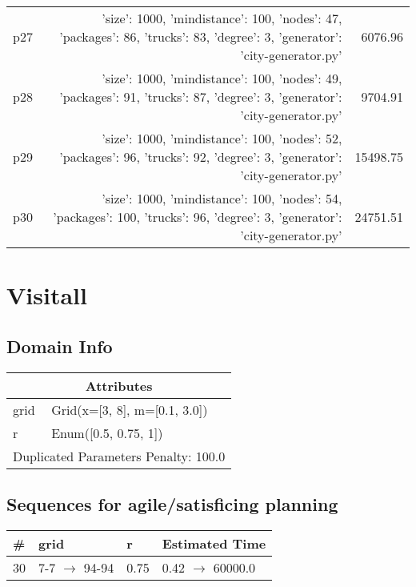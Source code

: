 \documentclass{article}
\begin{document}
\begin{center}
\begin{tabular}{@{}l|r|r@{}}
  p27&{'size': 1000, 'mindistance': 100, 'nodes': 47, 'packages': 86, 'trucks': 83, 'degree': 3, 'generator': 'city-generator.py'}&6076.96\\
  p28&{'size': 1000, 'mindistance': 100, 'nodes': 49, 'packages': 91, 'trucks': 87, 'degree': 3, 'generator': 'city-generator.py'}&9704.91\\
  p29&{'size': 1000, 'mindistance': 100, 'nodes': 52, 'packages': 96, 'trucks': 92, 'degree': 3, 'generator': 'city-generator.py'}&15498.75\\
  p30&{'size': 1000, 'mindistance': 100, 'nodes': 54, 'packages': 100, 'trucks': 96, 'degree': 3, 'generator': 'city-generator.py'}&24751.51
                            \end{tabular}
                            \end{center}
                    
                            \newpage \section{Visitall}
                    \subsection*{Domain Info}

                    \begin{center}
                    \begin{tabular}{@{}p{}p{}@{}}
                    \multicolumn{2}{c}{\bf \large Attributes}\\\midrule
                    grid & Grid(x=[3, 8], m=[0.1, 3.0])\\
r & Enum([0.5, 0.75, 1])
                    
                     \\\midrule
                    \multicolumn{2}{l}{Duplicated Parameters Penalty: 100.0}
                    \end{tabular}
                    \end{center}
                
                         \subsection*{Sequences for agile/satisficing planning}

                        \begin{center}
                        \begin{tabular}{@{}l|l|l|l@{}}
                        \# & grid & r & Estimated Time\\\midrule
                        30&7-7 $\rightarrow$ 94-94&0.75&0.42 $\rightarrow$ 60000.0
                        \end{tabular}
                        \end{center}
                    
\end{document}
